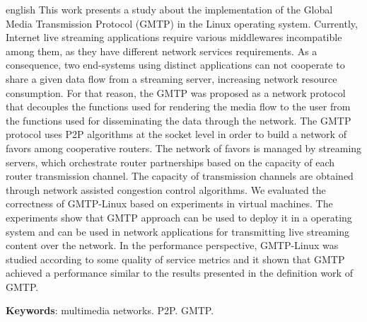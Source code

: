 \begin{resumo}[Abstract]
 \begin{otherlanguage*}{english}
This work presents a study about the implementation of the Global Media Transmission Protocol (GMTP) in the Linux operating system.
Currently, Internet live streaming applications require various middlewares incompatible among them, as they have different network services requirements.
As a consequence, two end-systems using distinct applications can not cooperate to share a given data flow from a streaming server, increasing network resource consumption.
For that reason, the GMTP was proposed as a network protocol that decouples the functions used for rendering the media flow to the user from the functions used for disseminating the data through the network. 
The GMTP protocol uses P2P algorithms at the socket level in order to build a network of favors among cooperative routers. 
The network of favors is managed by streaming servers, which orchestrate router partnerships based on the capacity of each router transmission channel. 
The capacity of transmission channels are obtained through network assisted congestion control algorithms.
We evaluated the correctness of GMTP-Linux based on experiments in virtual machines. 
The experiments show that GMTP approach can be used to deploy it in a operating system and can be used in network applications for transmitting live streaming content over the network.
In the performance perspective, GMTP-Linux was studied according to some quality of service metrics and it shown that GMTP achieved a performance similar to the results presented in the definition work of GMTP.

   \vspace{\onelineskip}
   
   \noindent 
   \textbf{Keywords}: multimedia networks. P2P. GMTP.
 \end{otherlanguage*}
\end{resumo}
